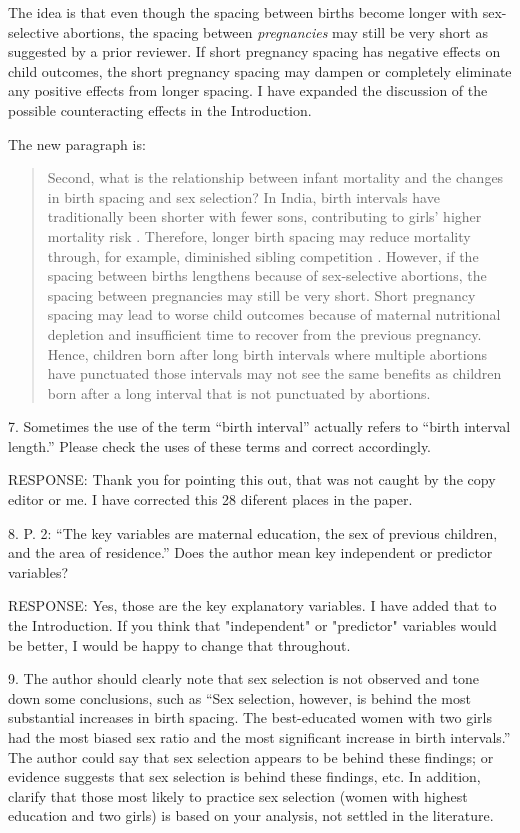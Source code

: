 \documentclass[letterpaper,12pt]{article}
\begin{document}
The idea is that even though the spacing between births become longer with sex-selective 
abortions, the spacing between \emph{pregnancies} may still be very short as suggested by a 
prior reviewer. 
If short pregnancy spacing has negative effects on child outcomes, the short pregnancy spacing 
may dampen or completely eliminate any positive effects from longer spacing. 
I have expanded the discussion of the possible counteracting effects in the Introduction.

The new paragraph is:
\begin{quote}
Second, what is the relationship between infant mortality and the changes in birth spacing
and sex selection? 
In India, birth intervals have traditionally been shorter with fewer sons, contributing to 
girls' higher mortality risk
\citep{Whitworth2002,Bhalotra2008,Maitra2008,Jayachandran2011,Jayachandran2017a}. 
Therefore, longer birth spacing may reduce mortality through, for example, diminished 
sibling competition \citep{Conde-Agudelo2012,Molitoris2019}. 
However, if the spacing between births lengthens because of sex-selective abortions, the 
spacing between pregnancies may still be very short. 
Short pregnancy spacing may lead to worse child outcomes because of maternal nutritional 
depletion and insufficient time to recover from the previous pregnancy. 
Hence, children born after long birth intervals where multiple abortions have punctuated 
those intervals may not see the same benefits as children born after a long interval that 
is not punctuated by abortions.
\end{quote}

7. Sometimes the use of the term “birth interval” actually refers to “birth interval
length.” Please check the uses of these terms and correct accordingly.

RESPONSE: Thank you for pointing this out, that was not caught by the copy editor
or me.
I have corrected this 28 diferent places in the paper.


8. P. 2: “The key variables are maternal education, the sex of previous children, and the
area of residence.” Does the author mean key independent or predictor variables?

RESPONSE: Yes, those are the key explanatory variables. 
I have added that to the Introduction.
If you think that "independent" or "predictor" variables would be better, I would
be happy to change that throughout.


9. The author should clearly note that sex selection is not observed and tone down some
conclusions, such as “Sex selection, however, is behind the most substantial increases in
birth spacing. The best-educated women with two girls had the most biased sex ratio and the
most significant increase in birth intervals.” The author could say that sex selection
appears to be behind these findings; or evidence suggests that sex selection is behind
these findings, etc. In addition, clarify that those most likely to practice sex selection
(women with highest education and two girls) is based on your analysis, not settled in the
literature.
\end{document}
